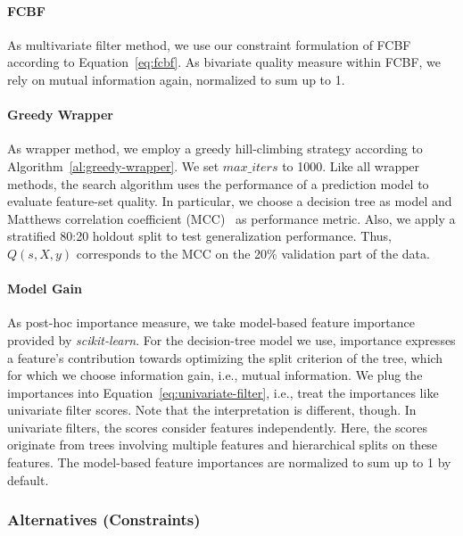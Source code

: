 \documentclass[conference]{IEEEtran}
\theoremstyle{definition}
\begin{document}
\paragraph{FCBF}

As multivariate filter method, we use our constraint formulation of FCBF~\cite{yu2003feature} according to Equation~\ref{eq:fcbf}.
As bivariate quality measure within FCBF, we rely on mutual information again, normalized to sum up to 1.

\paragraph{Greedy Wrapper}

As wrapper method, we employ a greedy hill-climbing strategy according to Algorithm~\ref{al:greedy-wrapper}.
We set $max\_iters$ to 1000.
Like all wrapper methods, the search algorithm uses the performance of a prediction model to evaluate feature-set quality.
In particular, we choose a decision tree as model and Matthews correlation coefficient (MCC)~\cite{matthews1975comparison} as performance metric.
Also, we apply a stratified 80:20 holdout split to test generalization performance.
Thus, $Q(s,X,y)$ corresponds to the MCC on the 20\% validation part of the data.

\paragraph{Model Gain}

As post-hoc importance measure, we take model-based feature importance provided by \emph{scikit-learn}.
For the decision-tree model we use, importance expresses a feature's contribution towards optimizing the split criterion of the tree, which for which we choose information gain, i.e., mutual information.
We plug the importances into Equation~\ref{eq:univariate-filter}, i.e., treat the importances like univariate filter scores.
Note that the interpretation is different, though.
In univariate filters, the scores consider features independently.
Here, the scores originate from trees involving multiple features and hierarchical splits on these features.
The model-based feature importances are normalized to sum up to 1 by default.

\subsubsection{Alternatives (Constraints)}
\label{sec:experimental-design:approaches:alternatives}
\end{document}
